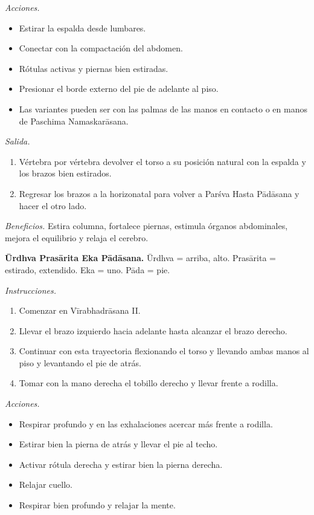 \emph{Acciones.}
\begin{itemize}
\item Estirar la espalda desde lumbares.
\item Conectar con la compactación del
abdomen.
\item Rótulas activas y piernas bien
estiradas.
\item Presionar el borde externo del pie de
adelante al piso.
\item Las variantes pueden ser con las palmas
de las manos en contacto o en manos de
Paschima Namaskarāsana.
\end{itemize}

\emph{Salida.}
\begin{enumerate}
\item Vértebra por vértebra devolver el torso
a su posición natural con la espalda y los
brazos bien estirados.
\item Regresar los brazos a la horizonatal
para volver a Parśva Hasta Pādāsana y hacer
el otro lado.
\end{enumerate}

\emph{Beneficios.} Estira columna, fortalece
piernas, estimula órganos abdominales, mejora
el equilibrio y relaja el cerebro.

\medskip\noindent\textbf{Ūrdhva Prasārita Eka
Pādāsana.}
Ūrdhva = arriba, alto. Prasārita = estirado,
extendido. Eka = uno. Pāda = pie.

\emph{Instrucciones.}
\begin{enumerate}
\item Comenzar en Vīrabhadrāsana II.
\item Llevar el brazo izquierdo hacia
adelante hasta alcanzar el brazo derecho.
\item Continuar con esta trayectoria
flexionando el torso y llevando ambas manos
al piso y levantando el pie de atrás.
\item Tomar con la mano derecha el tobillo
derecho y llevar frente a rodilla.
\end{enumerate}

\emph{Acciones.}
\begin{itemize}
\item Respirar profundo y en las exhalaciones
acercar más frente a rodilla.
\item Estirar bien la pierna de atrás y
llevar el pie al techo.
\item Activar rótula derecha y estirar bien
la pierna derecha.
\item Relajar cuello.
\item Respirar bien profundo y relajar la
mente.
\end{itemize}


